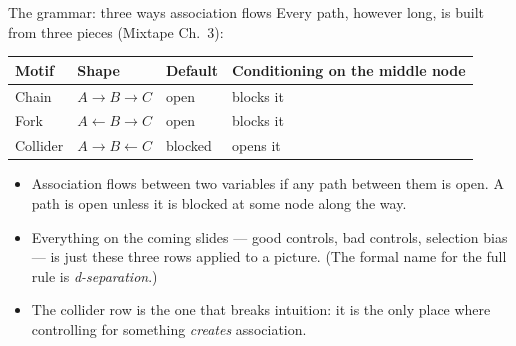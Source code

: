 \documentclass[aspectratio=169,11pt]{beamer}
\begin{document}
\begin{frame}{The grammar: three ways association flows}
Every path, however long, is built from three pieces (Mixtape Ch.~3):
\begin{center}
\begin{tabular}{llll}
\hline
Motif & Shape & Default & Conditioning on the middle node \\
\hline
\alert{Chain} & $A \rightarrow B \rightarrow C$ & open & \alert{blocks} it \\
\alert{Fork} & $A \leftarrow B \rightarrow C$ & open & \alert{blocks} it \\
\alert{Collider} & $A \rightarrow B \leftarrow C$ & \alert{blocked} & \alert{opens} it \\
\hline
\end{tabular}
\end{center}
\bigskip
\begin{itemize}
	\item Association flows between two variables if \alert{any} path between them is
	open. A path is open unless it is blocked at some node along the way.

	\item Everything on the coming slides --- good controls, bad controls, selection
	bias --- is just these three rows applied to a picture.
	(The formal name for the full rule is \emph{d-separation}.)

	\item The collider row is the one that breaks intuition: it is the only place
	where controlling for something \emph{creates} association.
\end{itemize}
\end{frame}
\end{document}
